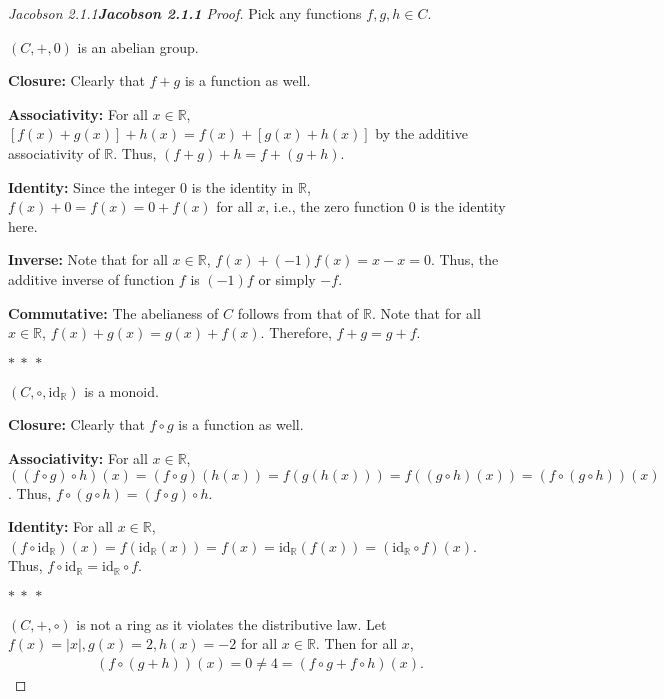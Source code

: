 \documentclass[12pt]{article}
\newenvironment{fproof}[1][]
  {\begin{proof}[\ifx\relax#1\relax\else\textbf{\large #1} Proof\fi]}
  {\end{proof}}
\newcommand{\abs}[1]{\left\lvert #1 \right\rvert}
\begin{document}
\begin{fproof}[Jacobson 2.1.1]
  Pick any functions \(f,g,h \in C\).

  \((C, +, 0)\) is an abelian group. 

  \textbf{Closure:}
  Clearly that \(f+g\) is a function as well.

  \textbf{Associativity:}
  For all \(x \in \mathbb{R}\),
  \([f(x) + g(x)] + h(x) = f(x) + [g(x) + h(x)]\) by the additive associativity of \(\mathbb{R}\). Thus, \((f + g) + h = f + (g + h)\).

  \textbf{Identity:}
  Since the integer 0 is the identity in \(\mathbb{R}\), \(f(x) + 0 = f(x) = 0 + f(x)\) for all \(x\), i.e., the zero function 0 is the identity here.

  \textbf{Inverse:}
  Note that for all \(x \in \mathbb{R}\), \(f(x) + (-1)f(x) = x - x = 0\). Thus, the additive inverse of function \(f\) is \((-1)f\) or simply \(-f\).

  \textbf{Commutative:}
  The abelianess of \(C\) follows from that of \(\mathbb{R}\). Note that for all \(x \in \mathbb{R}\), \(f(x) + g(x) = g(x) + f(x)\). Therefore, \(f + g = g + f\).

  \begin{center}
    \(\ast~\ast~\ast\)
  \end{center}

  \((C, \circ, \text{id}_{\mathbb{R}})\) is a monoid.

  \textbf{Closure:}
  Clearly that \(f \circ g\) is a function as well.

  \textbf{Associativity:}
  For all \(x \in \mathbb{R}\),
  \(((f \circ g) \circ h) (x)= (f \circ g)(h(x)) = f(g(h(x))) = f((g \circ h) (x)) = (f \circ (g \circ h)) (x)\).
  Thus, \(f \circ (g \circ h) = (f \circ g) \circ h\).

  \textbf{Identity:}
  For all \(x \in \mathbb{R}\), \((f \circ \text{id}_{\mathbb{R}}) (x) = f(\text{id}_{\mathbb{R}}(x)) = f(x) = \text{id}_{\mathbb{R}}(f(x)) = (\text{id}_{\mathbb{R}} \circ f)(x)\). Thus, \(f \circ \text{id}_{\mathbb{R}} = \text{id}_{\mathbb{R}} \circ f\).

  \begin{center}
    \(\ast~\ast~\ast\)
  \end{center}

  \((C, +, \circ)\) is not a ring as it violates the distributive law.
  Let \(f(x) = \abs{x}, g(x) = 2, h(x) = -2\) for all \(x \in \mathbb{R}\).
  Then for all \(x\),
  \begin{align*}
    (f \circ (g + h))(x) = 0 \neq 4 = (f \circ g + f \circ h)(x).
  \end{align*}
\end{fproof}
\end{document}
